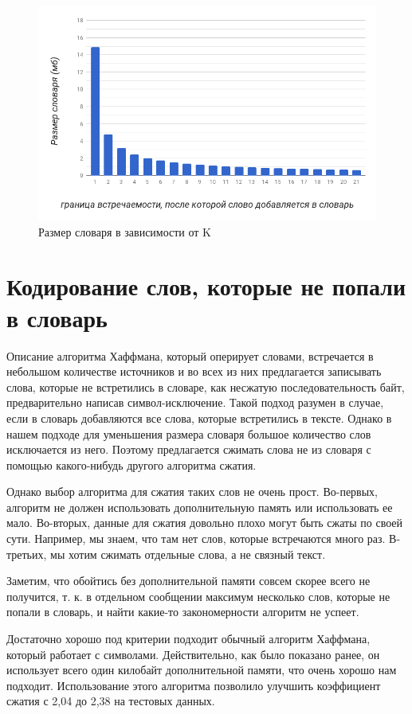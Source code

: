 \begin{figure}[h!]
  \includegraphics[width=5in]{pics/dict_size.png}
  \caption{Размер словаря в зависимости от K}
  \label{fig6}
\end{figure}

\section{Кодирование слов, которые не попали в словарь}

Описание алгоритма Хаффмана, который оперирует словами, встречается в небольшом количестве источников и во 
всех из них предлагается записывать слова, которые не встретились в словаре, как несжатую последовательность 
байт, предварительно написав символ-исключение. Такой подход разумен в случае, если в словарь добавляются все 
слова, которые встретились в тексте. Однако в нашем подходе для уменьшения размера словаря большое количество
слов исключается из него. Поэтому предлагается сжимать слова не из словаря с помощью какого-нибудь 
другого алгоритма сжатия.

Однако выбор алгоритма для сжатия таких слов не очень прост. Во-первых, алгоритм не должен использовать дополнительную память
или использовать ее мало. Во-вторых, данные для сжатия довольно плохо могут быть сжаты по своей сути. 
Например, мы знаем, что там нет слов, которые встречаются много раз. В-третьих, мы хотим
сжимать отдельные слова, а не связный текст.

Заметим, что обойтись без дополнительной памяти совсем скорее всего не получится, т. к. в отдельном сообщении максимум несколько слов,
которые не попали в словарь, и найти какие-то закономерности алгоритм не успеет.

Достаточно хорошо под критерии подходит обычный алгоритм Хаффмана, который работает с символами. 
Действительно, как было показано ранее, он использует всего один килобайт дополнительной памяти, что очень хорошо нам подходит.
Использование этого алгоритма позволило улучшить коэффициент сжатия с 2,04 до 2,38 на тестовых данных.

